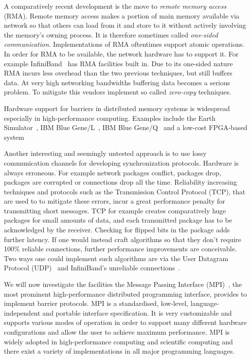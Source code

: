 \documentclass[a4paper, 10pt]{article}
\begin{document}
A comparatively recent development is the move to \emph{remote memory access} (RMA). Remote memory access makes a portion of main memory available via network so that others can load from it and store to it without actively involving the memory's owning process. It is therefore sometimes called \emph{one-sided communication}. Implementations of RMA oftentimes support atomic operations.
In order for RMA to be available, the network hardware has to support it. For example InfiniBand~\cite{infiniband} has RMA facilities built in.
Due to its one-sided nature RMA incurs less overhead than the two previous techniques, but still buffers data. At very high networking bandwidths buffering data becomes a serious problem. To mitigate this vendors implement so called \emph{zero-copy} techniques.

Hardware support for barriers in distributed memory systems is widespread especially in high-performance computing. Examples include the Earth Simulator~\cite{earthsimulator}, IBM Blue Gene/L~\cite{bluegenel}, IBM Blue Gene/Q~\cite{bluegeneq} and a low-cost FPGA-based system~\cite{hoefler2006b}

Another interesting and seemingly untested approach is to use lossy communication channels for developing synchronization protocols. Hardware is always erroneous. For example network packages conflict, packages drop, packages are corrupted or connections drop all the time. Reliability increasing techniques and protocols such as the Transmission Control Protocol (TCP), that are used to to mitigate these errors, incur a great performance penalty for transmitting short messages. TCP for example creates comparatively huge packages for small amounts of data, and each transmitted package has to be acknowledged by the receiver. Checking for flipped bits in the package adds further latency.
If one would instead craft algorithms so that they don't require 100\% reliable connections, further performance improvements are conceivable.
Two ways one could implement such algorithms are via the User Datagram Protocol (UDP)~\cite{udp} and InfiniBand's unreliable connections~\cite{infiniband}.

We will now investigate the facilities the Message Passing Interface (MPI)~\cite{mpi3}, the most prominent high-performance distributed programming interface, provides to implement barrier protocols. MPI is a standardised, low-level, language-independent and portable interface specification. It is very customizable and supports various modes of operation in order to support many different hardware configurations and allow the user to achieve maximum performance. MPI is widely adopted in high-performance computing and scientific computing\cite{mpiadoptiona, mpiadoptionb, mpiadoptionc} and there exist a variety of implementations in all major programming languages.
\end{document}
